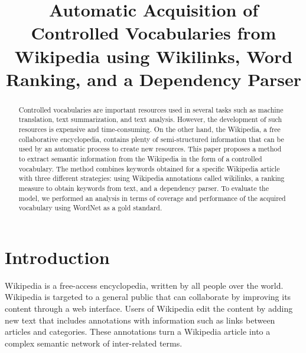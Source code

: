 \documentclass[oribibl]{llncs}
\begin{document}
\title{Automatic Acquisition of Controlled Vocabularies from Wikipedia using Wikilinks, Word Ranking, and a Dependency Parser}



\maketitle

\begin{abstract}
Controlled vocabularies are important resources used in several tasks such as machine translation, text summarization, and text analysis. However, the development of such resources is expensive and time-consuming. On the other hand, the Wikipedia, a free collaborative encyclopedia, contains plenty of semi-structured information that can be used by an automatic process to create new resources. This paper proposes a method to extract semantic information from the Wikipedia in the form of a controlled vocabulary. The method combines keywords obtained for a specific Wikipedia article with three different strategies: using Wikipedia annotations called wikilinks, a ranking measure to obtain keywords from text, and a dependency parser. To evaluate the model, we performed an analysis in terms of coverage and performance of the acquired vocabulary using WordNet as a gold standard. 
\end{abstract}


\section{Introduction}

Wikipedia is a free-access encyclopedia, written by all people over the world. Wikipedia is targeted to a general public that can collaborate by improving its content through a web interface. Users of Wikipedia edit the content by adding new text that includes annotations with information such as links between articles and categories. These annotations turn a Wikipedia article into a complex semantic network of inter-related terms.
\end{document}
